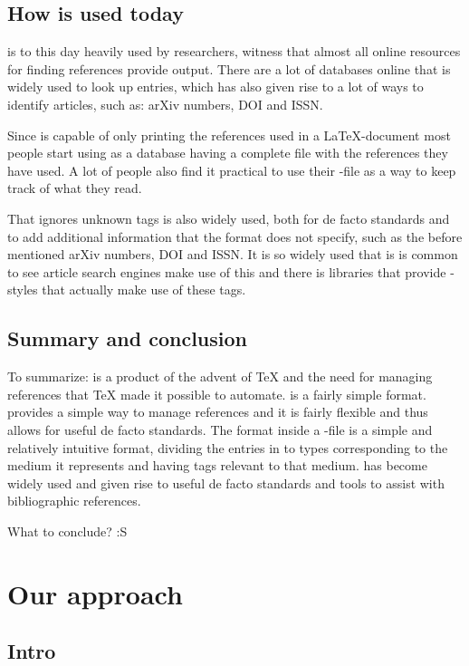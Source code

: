 \section{How {\bibtex} is used today}
\label{sec:how_bibtex_is_used_today}

{\bibtex} is to this day heavily used by researchers, witness that
almost all online resources for finding references provide {\bibtex}
output.  There are a lot of databases online that is widely used to
look up entries, which has also given rise to a lot of ways to
identify articles, such as: arXiv numbers, DOI and ISSN.

Since {\bibtex} is capable of only printing the references used in a
{\LaTeX}-document most people start using {\bibtex} as a database
having a complete file with the references they have used.  A lot of
people also find it practical to use their {\bibtex}-file as a way to
keep track of what they read.

That {\bibtex} ignores unknown tags is also widely used, both for de
facto standards and to add additional information that the format does
not specify, such as the before mentioned arXiv numbers, DOI and ISSN.
It is so widely used that is is common to see article search engines
make use of this and there is libraries that provide {\bibtex}-styles
that actually make use of these tags.


\section{Summary and conclusion}

To summarize: {\bibtex} is a product of the advent of {\TeX} and the
need for managing references that {\TeX} made it possible to automate.
{\bibtex} is a fairly simple format.  {\bibtex} provides a simple way
to manage references and it is fairly flexible and thus allows for
useful de facto standards.  The format inside a {\bibtex}-file is a
simple and relatively intuitive format, dividing the entries in to
types corresponding to the medium it represents and having tags
relevant to that medium.  {\bibtex} has become widely used and given
rise to useful de facto standards and tools to assist with
bibliographic references.

What to conclude? :S


\chapter{Our approach}
\section{Intro}

